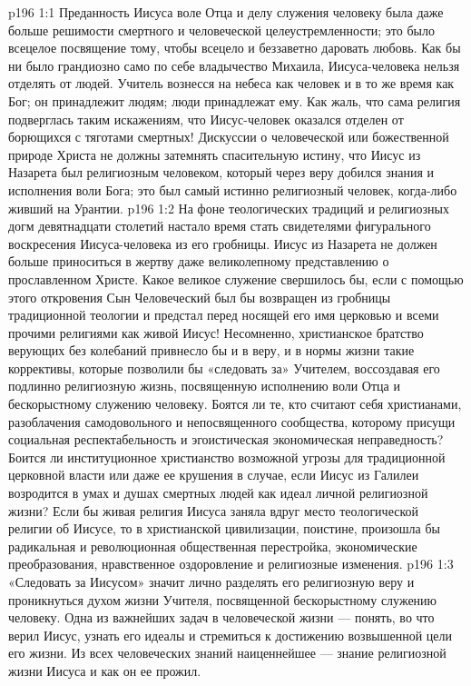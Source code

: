 \vs p196 1:1 Преданность Иисуса воле Отца и делу служения человеку была даже больше решимости смертного и человеческой целеустремленности; это было всецелое посвящение тому, чтобы всецело и беззаветно даровать любовь. Как бы ни было грандиозно само по себе владычество Михаила, Иисуса\hyp{}человека нельзя отделять от людей. Учитель вознесся на небеса как человек и в то же время как Бог; он принадлежит людям; люди принадлежат ему. Как жаль, что сама религия подверглась таким искажениям, что Иисус\hyp{}человек оказался отделен от борющихся с тяготами смертных! Дискуссии о человеческой или божественной природе Христа не должны затемнять спасительную истину, что Иисус из Назарета был религиозным человеком, который через веру добился знания и исполнения воли Бога; это был самый истинно религиозный человек, когда\hyp{}либо живший на Урантии.
\vs p196 1:2 На фоне теологических традиций и религиозных догм девятнадцати столетий настало время стать свидетелями фигурального воскресения Иисуса\hyp{}человека из его гробницы. Иисус из Назарета не должен больше приноситься в жертву даже великолепному представлению о прославленном Христе. Какое великое служение свершилось бы, если с помощью этого откровения Сын Человеческий был бы возвращен из гробницы традиционной теологии и предстал перед носящей его имя церковью и всеми прочими религиями как живой Иисус! Несомненно, христианское братство верующих без колебаний привнесло бы и в веру, и в нормы жизни такие коррективы, которые позволили бы «следовать за» Учителем, воссоздавая его подлинно религиозную жизнь, посвященную исполнению воли Отца и бескорыстному служению человеку. Боятся ли те, кто считают себя христианами, разоблачения самодовольного и непосвященного сообщества, которому присущи социальная респектабельность и эгоистическая экономическая неправедность? Боится ли институционное христианство возможной угрозы для традиционной церковной власти или даже ее крушения в случае, если Иисус из Галилеи возродится в умах и душах смертных людей как идеал личной религиозной жизни? Если бы живая религия Иисуса заняла вдруг место теологической религии об Иисусе, то в христианской цивилизации, поистине, произошла бы радикальная и революционная общественная перестройка, экономические преобразования, нравственное оздоровление и религиозные изменения.
\vs p196 1:3 \pc «Следовать за Иисусом» значит лично разделять его религиозную веру и проникнуться духом жизни Учителя, посвященной бескорыстному служению человеку. Одна из важнейших задач в человеческой жизни --- понять, во что верил Иисус, узнать его идеалы и стремиться к достижению возвышенной цели его жизни. Из всех человеческих знаний наиценнейшее --- знание религиозной жизни Иисуса и как он ее прожил.
